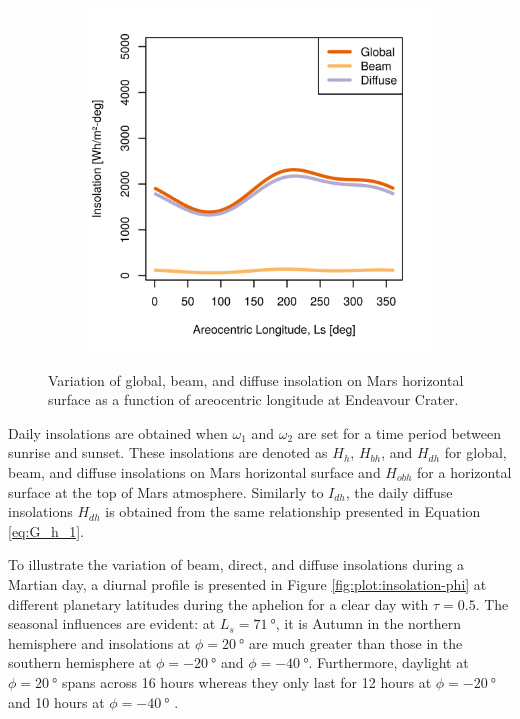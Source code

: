 \begin{figure}[h]
\begin{subfigure}[t]{\subfigureWidth}
  		\label{fig:sub:insolation-ls-tau-factor-2}
  	\end{subfigure}\hfill
	   \begin{subfigure}[t]{\subfigureWidth}
      \centering
  		\includegraphics[height=\graphicsHeight]{sections/martian-environment/plots/hh-hbh-and-hdh-as-a-function-of-ls-for-tau3-phi205-and-albedo-027}
  		\label{fig:sub:insolation-ls-tau-factor-3}
	   \end{subfigure}\hfill
	\caption{Variation of global, beam, and diffuse insolation on Mars horizontal surface as a function of areocentric longitude at Endeavour Crater.}
	\label{fig:plot:insolation-ls}
\vspace{-2ex}
\end{figure}

Daily insolations are obtained when $\omega_1$ and $\omega_2$ are set for a time period between sunrise and sunset. These insolations are denoted as $H_{h}$, $H_{bh}$, and $H_{dh}$ for global, beam, and diffuse insolations on Mars horizontal surface and $H_{obh}$ for a horizontal surface at the top of Mars atmosphere. Similarly to $I_{dh}$, the daily diffuse insolations $H_{dh}$ is obtained from the same relationship presented in Equation \ref{eq:G_h_1}.

To illustrate the variation of beam, direct, and diffuse insolations during a Martian day, a diurnal profile is presented in Figure \ref{fig:plot:insolation-phi} at different planetary latitudes during the aphelion for a clear day with $\tau = 0.5$. The seasonal influences are evident: at $L_{s} = \SI{71}{\degree}$, it is Autumn in the northern hemisphere and insolations at $\phi = \SI{20}{\degree}$ are much greater than those in the southern hemisphere at $\phi = \SI{-20}{\degree}$ and $\phi = \SI{-40}{\degree}$. Furthermore, daylight at $\phi = \SI{20}{\degree}$ spans across 16 hours whereas they only last for 12 hours at $\phi = \SI{-20}{\degree}$ and 10 hours at $\phi = \SI{-40}{\degree}$ .


